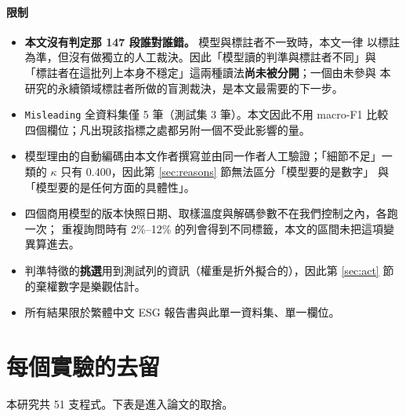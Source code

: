 \documentclass[11pt,a4paper]{ctexart}
\newcommand{\fn}[1]{\texttt{#1}}
\begin{document}
\paragraph{限制}
\begin{itemize}[leftmargin=2em, itemsep=2pt]
  \item \textbf{本文沒有判定那 147 段誰對誰錯。} 模型與標註者不一致時，本文一律
        以標註為準，但沒有做獨立的人工裁決。因此「模型讀的判準與標註者不同」與
        「標註者在這批列上本身不穩定」這兩種讀法\textbf{尚未被分開}；一個由未參與
        本研究的永續領域標註者所做的盲測裁決，是本文最需要的下一步。
  \item \fn{Misleading} 全資料集僅 5 筆（測試集 3 筆）。本文因此不用 macro-F1 比較
        四個欄位；凡出現該指標之處都另附一個不受此影響的量。
  \item 模型理由的自動編碼由本文作者撰寫並由同一作者人工驗證；「細節不足」一類的
        $\kappa$ 只有 0.400，因此第 \ref{sec:reasons} 節無法區分「模型要的是數字」
        與「模型要的是任何方面的具體性」。
  \item 四個商用模型的版本快照日期、取樣溫度與解碼參數不在我們控制之內，各跑一次；
        重複詢問時有 2\%--12\% 的列會得到不同標籤，本文的區間未把這項變異算進去。
  \item 判準特徵的\textbf{挑選}用到測試列的資訊（權重是折外擬合的），因此第
        \ref{sec:act} 節的棄權數字是樂觀估計。
  \item 所有結果限於繁體中文 ESG 報告書與此單一資料集、單一欄位。
\end{itemize}

\appendix
\section{每個實驗的去留}

本研究共 51 支程式。下表是進入論文的取捨。
\end{document}
